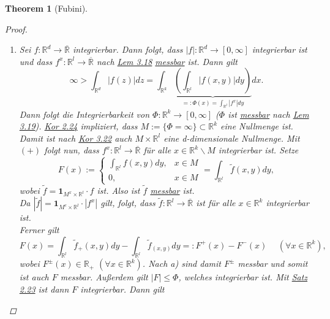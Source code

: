 \documentclass[a4paper]{report}
\newcommand{\doubleOne}{\textbf{1}}
\newcommand{\R}{\mathbb{R}}
\newcommand{\Rq}{\overline{\R}}
\newcommand{\jhyperref}[2]{\hyperref[j_#1]{#2}}
\newcommand{\jlink}[1]{\jhyperref{#1}{#1}}
\newcommand{\jabb}[3]{ #1: #2 \rightarrow #3 }
\theoremstyle{plain}
\newtheorem{thm}{Theorem}[chapter]
\theoremstyle{definition}
\begin{document}
{{{{\begin{thm}[Fubini]
\begin{proof}
\begin{enumerate}
            \item
                Sei $\jabb{f}{\R^d}{\Rq}$ integrierbar. Dann folgt, dass $\jabb{|f|}{\R^d}{[0,\infty]}$ integrierbar ist und dass $\jabb{f^x}{\R^l}{\Rq}$ nach \jlink{Lem 3.18} \jlink{messbar} ist. Dann gilt
                \begin{displaymath}
                    \tag{$+$}
                    \infty > \int_{\R^d} |f(z)| dz = \int_{\R^k} \underbrace{\left(\int_{\R^l} |f(x,y)|dy \right)}_{=: \Phi(x) = \int_{\R^l} |f^x|dy}dx.
                \end{displaymath}
                Dann folgt die Integrierbarkeit von $\jabb{\Phi}{\R^k}{[0,\infty]}$ ($\Phi$ ist \jlink{messbar} nach \jlink{Lem 3.19}). \jlink{Kor 2.24} impliziert, dass $M:= \{\Phi = \infty\} \subset \R^k$ eine Nullmenge ist. Damit ist nach \jlink{Kor 3.22} auch $M\times \R^l$ eine d-dimensionale Nullmenge. Mit $(+)$ folgt nun, dass $\jabb{f^x}{\R^l}{\Rq}$ für alle $x\in\R^k\backslash M$ integrierbar ist. Setze
                \begin{displaymath}
                    \tag{$*$}
                    F(x) := \begin{cases}
                                \int_{\R^l} f(x,y)dy, &x\in M\\
                                0, &x\in M
                            \end{cases}
                         = \int_{\R^l} \tilde{f}(x,y)dy,
                \end{displaymath}
                wobei $\tilde{f} = \doubleOne_{M^x\times \R^l} \cdot f$ ist. Also ist $\tilde{f}$ \jlink{messbar} ist.\\
                Da $|\tilde{f}| = \doubleOne_{M^c\times \R^l}\cdot |f^x|$ gilt,  folgt, dass $\jabb{\tilde{f}}{\R^l}{\Rq}$ ist für alle $x\in \R^k$ integrierbar ist.\\
                Ferner gilt
                \begin{displaymath}
                    F(x) = \int_{\R^l} \tilde{f}_+(x,y)dy - \int_{\R^l} \tilde{f}_(x,y)dy =: F^+(x) - F^-(x) \hspace{15pt} (\forall x\in \R^k),
                \end{displaymath}
                wobei $F^\pm(x) \in \R_+$ $(\forall x\in\R^k)$. Nach a) sind damit $F^\pm$ messbar und somit ist auch $F$ messbar. Außerdem gilt $|F| \le \Phi$, welches integrierbar ist. Mit \jlink{Satz 2.23} ist dann $F$ integrierbar. Dann gilt
                \begin{displaymath}

\end{displaymath}
\end{enumerate}
\end{proof}
\end{thm}}}}}
\end{document}
